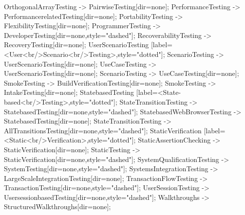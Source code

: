 \documentclass{article}
\begin{document}
{OrthogonalArrayTesting -> PairwiseTesting[dir=none];
PerformanceTesting -> PerformancerelatedTesting[dir=none];
PortabilityTesting -> FlexibilityTesting[dir=none];
ProgrammerTesting -> DeveloperTesting[dir=none,style="dashed"];
RecoverabilityTesting -> RecoveryTesting[dir=none];
UserScenarioTesting [label=<User<br/>Scenario<br/>Testing>,style="dotted"];
ScenarioTesting -> UserScenarioTesting[dir=none];
UseCaseTesting -> UserScenarioTesting[dir=none];
ScenarioTesting -> UseCaseTesting[dir=none];
SmokeTesting -> BuildVerificationTesting[dir=none];
SmokeTesting -> IntakeTesting[dir=none];
StatebasedTesting [label=<State-based<br/>Testing>,style="dotted"];
StateTransitionTesting -> StatebasedTesting[dir=none,style="dashed"];
StatebasedWebBrowserTesting -> StatebasedTesting[dir=none];
StateTransitionTesting -> AllTransitionsTesting[dir=none,style="dashed"];
StaticVerification [label=<Static<br/>Verification>,style="dotted"];
StaticAssertionChecking -> StaticVerification[dir=none];
StaticTesting -> StaticVerification[dir=none,style="dashed"];
SystemQualificationTesting -> SystemTesting[dir=none,style="dashed"];
SystemsIntegrationTesting -> LargeScaleIntegrationTesting[dir=none];
TransactionFlowTesting -> TransactionTesting[dir=none,style="dashed"];
UserSessionTesting -> UsersessionbasedTesting[dir=none,style="dashed"];
Walkthroughs -> StructuredWalkthroughs[dir=none];

}
\end{document}
